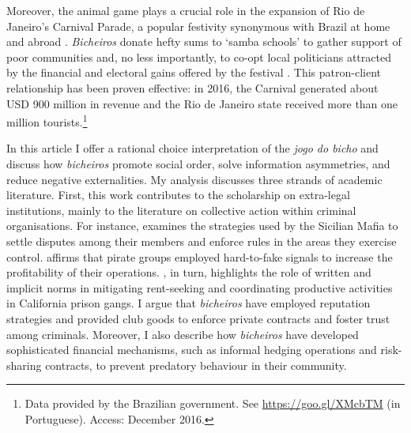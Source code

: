 
Moreover, the animal game plays a crucial role in the expansion of Rio de Janeiro's Carnival Parade, a popular festivity synonymous with Brazil at home and abroad \citep{araujo2003carnaval,costa2001100,da1973carnaval, da1979carnavais,vianna1995misterio}. \emph{Bicheiros} donate hefty sums to `samba schools' to gather support of poor communities and, no less importantly, to co-opt local politicians attracted by the financial and electoral gains offered by the festival \citep{cavalcanti2006carnaval, queiroz1992carnaval}. This patron-client relationship has been proven effective: in 2016, the Carnival generated about USD 900 million in revenue and the Rio de Janeiro state received more than one million tourists.\footnote{Data provided by the Brazilian government. See \href{https://goo.gl/XMcbTM}{https://goo.gl/XMcbTM} (in Portuguese). Access: December 2016.}

In this article I offer a rational choice interpretation of the \emph{jogo do bicho} and discuss how \emph{bicheiros} promote social order, solve information asymmetries, and reduce negative externalities. My analysis discusses three strands of academic literature. First, this work contributes to the scholarship on extra-legal institutions, mainly to the literature on collective action within criminal organisations. For instance, \citet{gambetta1996sicilian} examines the strategies used by the Sicilian Mafia to settle disputes among their members and enforce rules in the areas they exercise control. \citet{leeson2007arrgh,leeson2009invisible,leeson2010pirational} affirms that pirate groups employed hard-to-fake signals to increase the profitability of their operations. \citet{skarbek2011governance,skarbek2012prison,skarbek2014social}, in turn, highlights the role of written and implicit norms in mitigating rent-seeking and coordinating productive activities in California prison gangs. I argue that \emph{bicheiros} have employed reputation strategies and provided club goods to enforce private contracts and foster trust among criminals. Moreover, I also describe how \emph{bicheiros} have developed sophisticated financial mechanisms, such as informal hedging operations and risk-sharing contracts, to prevent predatory behaviour in their community.

